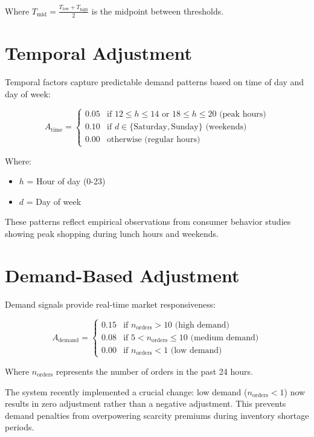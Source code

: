\documentclass[12pt,a4paper,oneside]{report}
\begin{document}
Where $T_{\text{mid}} = \frac{T_{\text{low}} + T_{\text{high}}}{2}$ is the midpoint between thresholds.

\section{Temporal Adjustment}

Temporal factors capture predictable demand patterns based on time of day and day of week:

\begin{equation}
A_{\text{time}} = \begin{cases}
0.05 & \text{if } 12 \leq h \leq 14 \text{ or } 18 \leq h \leq 20 \text{ (peak hours)} \\
0.10 & \text{if } d \in \{\text{Saturday}, \text{Sunday}\} \text{ (weekends)} \\
0.00 & \text{otherwise (regular hours)}
\end{cases}
\end{equation}

Where:
\begin{itemize}
    \item $h$ = Hour of day (0-23)
    \item $d$ = Day of week
\end{itemize}

These patterns reflect empirical observations from consumer behavior studies showing peak shopping during lunch hours and weekends.

\section{Demand-Based Adjustment}

Demand signals provide real-time market responsiveness:

\begin{equation}
A_{\text{demand}} = \begin{cases}
0.15 & \text{if } n_{\text{orders}} > 10 \text{ (high demand)} \\
0.08 & \text{if } 5 < n_{\text{orders}} \leq 10 \text{ (medium demand)} \\
0.00 & \text{if } n_{\text{orders}} < 1 \text{ (low demand)}
\end{cases}
\end{equation}

Where $n_{\text{orders}}$ represents the number of orders in the past 24 hours.

The system recently implemented a crucial change: low demand ($n_{\text{orders}} < 1$) now results in zero adjustment rather than a negative adjustment. This prevents demand penalties from overpowering scarcity premiums during inventory shortage periods.
\end{document}
